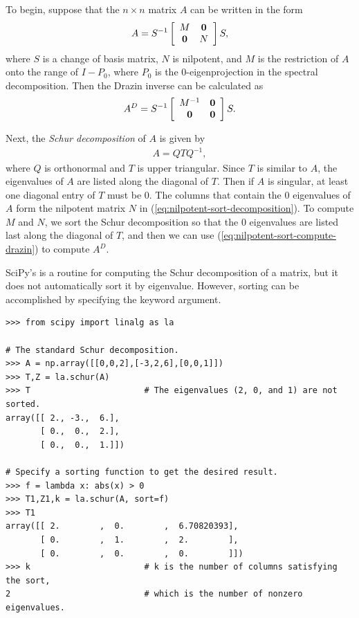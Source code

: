 To begin, suppose that the $n \times n$ matrix $A$ can be written in the form
\begin{equation}
A = S^{-1}
\left[\begin{array}{cc}
M & \mathbf{0} \\
\mathbf{0} & N \\
\end{array}\right] S,
\label{eq:nilpotent-sort-decomposition}
\end{equation}
where $S$ is a change of basis matrix, $N$ is nilpotent, and $M$ is the restriction of $A$ onto the range of $I - P_0$, where $P_0$ is the 0-eigenprojection in the spectral decomposition.
Then the Drazin inverse can be calculated as
\begin{equation}
A^D = S^{-1}
\left[\begin{array}{cc}
M^{-1} & \mathbf{0} \\
\mathbf{0} & \mathbf{0} \\
\end{array}\right] S.
\label{eq:nilpotent-sort-compute-drazin}
\end{equation}

Next, the \emph{Schur decomposition} of $A$ is given by
\begin{align}
A = QTQ^{-1},
\end{align}
where $Q$ is orthonormal and $T$ is upper triangular.
Since $T$ is similar to $A$, the eigenvalues of $A$ are listed along the diagonal of $T$.
Then if $A$ is singular, at least one diagonal entry of $T$ must be $0$.
The columns that contain the $0$ eigenvalues of $A$ form the nilpotent matrix $N$ in (\ref{eq:nilpotent-sort-decomposition}).
To compute $M$ and $N$, we sort the Schur decomposition so that the $0$ eigenvalues are listed last along the diagonal of $T$, and then we can use (\ref{eq:nilpotent-sort-compute-drazin}) to compute $A^D$.

SciPy's  is a routine for computing the Schur decomposition of a matrix, but it does not automatically sort it by eigenvalue.
However, sorting can be accomplished by specifying the  keyword argument.

\begin{lstlisting}
>>> from scipy import linalg as la

# The standard Schur decomposition.
>>> A = np.array([[0,0,2],[-3,2,6],[0,0,1]])
>>> T,Z = la.schur(A)
>>> T                       # The eigenvalues (2, 0, and 1) are not sorted.
array([[ 2., -3.,  6.],
       [ 0.,  0.,  2.],
       [ 0.,  0.,  1.]])

# Specify a sorting function to get the desired result.
>>> f = lambda x: abs(x) > 0
>>> T1,Z1,k = la.schur(A, sort=f)
>>> T1
array([[ 2.        ,  0.        ,  6.70820393],
       [ 0.        ,  1.        ,  2.        ],
       [ 0.        ,  0.        ,  0.        ]])
>>> k                       # k is the number of columns satisfying the sort,
2                           # which is the number of nonzero eigenvalues.
\end{lstlisting}

